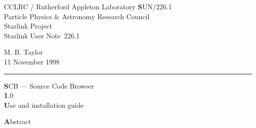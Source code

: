\documentclass[twoside,11pt]{article}
\newcommand{\stardoccategory}  {Starlink User Note}
\newcommand{\stardocinitials}  {SUN}
\newcommand{\stardocnumber}    {226.1}
\newcommand{\stardocauthors}   {M. B. Taylor}
\newcommand{\stardocdate}      {11 November 1998}
\newcommand{\stardoctitle}     {SCB --- Source Code Browser}
\newcommand{\stardocversion}   {1.0}
\newcommand{\stardocmanual}    {Use and installation guide}
\newcommand{\stardocname}{\stardocinitials /\stardocnumber}
\newenvironment{latexonly}{}{}
\renewcommand{\_}{\texttt{\symbol{95}}}
\begin{document}
\thispagestyle{empty}

\begin{latexonly}
   CCLRC / {\textsc Rutherford Appleton Laboratory} \hfill {\textbf \stardocname}\\
   {\large Particle Physics \& Astronomy Research Council}\\
   {\large Starlink Project\\}
   {\large \stardoccategory\ \stardocnumber}
   \begin{flushright}
   \stardocauthors\\
   \stardocdate
   \end{flushright}
   \vspace{-4mm}
   \rule{\textwidth}{0.5mm}
   \vspace{5mm}
   \begin{center}
   {\Huge\textbf  \stardoctitle \\ [2.5ex]}
   {\LARGE\textbf \stardocversion \\ [4ex]}
   {\Huge\textbf  \stardocmanual}
   \end{center}
   \vspace{5mm}


   \vspace{10mm}
   \begin{center}
      {\Large\textbf Abstract}
   \end{center}
\end{latexonly}
\end{document}
